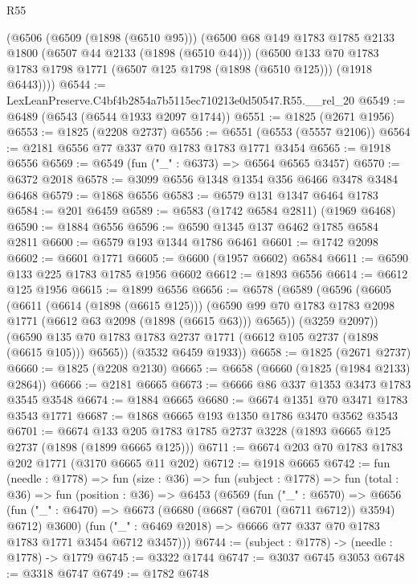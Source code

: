\begin{lexlean}{R55}
\begin{coremodule}
    (@6506
      (@6509 (@1898 (@6510 @95)))
      (@6500
        @68
        @149
        @1783
        @1785
        @2133
        @1800
        (@6507 @44 @2133 (@1898 (@6510 @44)))
        (@6500
          @133
          @70
          @1783
          @1783
          @1798
          @1771
          (@6507 @125 @1798 (@1898 (@6510 @125)))
          (@1918 @6443))))
@6544 := LexLeanPreserve.C4bf4b2854a7b5115ec710213e0d50547.R55.__rel_20
@6549 := @6489 (@6543 (@6544 @1933 @2097 @1744))
@6551 := @1825 (@2671 @1956)
@6553 := @1825 (@2208 @2737)
@6556 := @6551 (@6553 (@5557 @2106))
@6564 := @2181 @6556 @77 @337 @70 @1783 @1783 @1771 @3454
@6565 := @1918 @6556
@6569 := @6549 (fun ("_" : @6373) => @6564 @6565 @3457)
@6570 := @6372 @2018
@6578 := @3099 @6556 @1348 @1354 @356 @6466 @3478 @3484 @6468
@6579 := @1868 @6556
@6583 := @6579 @131 @1347 @6464 @1783
@6584 := @201 @6459
@6589 := @6583 (@1742 @6584 @2811) (@1969 @6468)
@6590 := @1884 @6556
@6596 := @6590 @1345 @137 @6462 @1785 @6584 @2811
@6600 := @6579 @193 @1344 @1786 @6461
@6601 := @1742 @2098
@6602 := @6601 @1771
@6605 := @6600 (@1957 @6602) @6584
@6611 := @6590 @133 @225 @1783 @1785 @1956 @6602
@6612 := @1893 @6556
@6614 := @6612 @125 @1956
@6615 := @1899 @6556
@6656 := @6578
    (@6589
      (@6596
        (@6605
          (@6611
            (@6614 (@1898 (@6615 @125)))
            (@6590 @99 @70 @1783 @1783 @2098 @1771 (@6612 @63 @2098 (@1898 (@6615 @63))) @6565))
          (@3259 @2097))
        (@6590 @135 @70 @1783 @1783 @2737 @1771 (@6612 @105 @2737 (@1898 (@6615 @105))) @6565))
      (@3532 @6459 @1933))
@6658 := @1825 (@2671 @2737)
@6660 := @1825 (@2208 @2130)
@6665 := @6658 (@6660 (@1825 (@1984 @2133) @2864))
@6666 := @2181 @6665
@6673 := @6666 @86 @337 @1353 @3473 @1783 @3545 @3548
@6674 := @1884 @6665
@6680 := @6674 @1351 @70 @3471 @1783 @3543 @1771
@6687 := @1868 @6665 @193 @1350 @1786 @3470 @3562 @3543
@6701 := @6674 @133 @205 @1783 @1785 @2737 @3228 (@1893 @6665 @125 @2737 (@1898 (@1899 @6665 @125)))
@6711 := @6674 @203 @70 @1783 @1783 @202 @1771 (@3170 @6665 @11 @202)
@6712 := @1918 @6665
@6742 := fun (needle : @1778) =>
  fun (size : @36) =>
  fun (subject : @1778) =>
  fun (total : @36) =>
  fun (position : @36) =>
  @6453
    (@6569
      (fun ("_" : @6570) =>
      @6656
        (fun ("_" : @6470) => @6673 (@6680 (@6687 (@6701 (@6711 @6712)) @3594) @6712) @3600)
        (fun ("_" : @6469 @2018) => @6666 @77 @337 @70 @1783 @1783 @1771 @3454 @6712 @3457)))
@6744 := (subject : @1778) -> (needle : @1778) -> @1779
@6745 := @3322 @1744
@6747 := @3037 @6745 @3053
@6748 := @3318 @6747
@6749 := @1782 @6748

\end{coremodule}
\end{lexlean}
